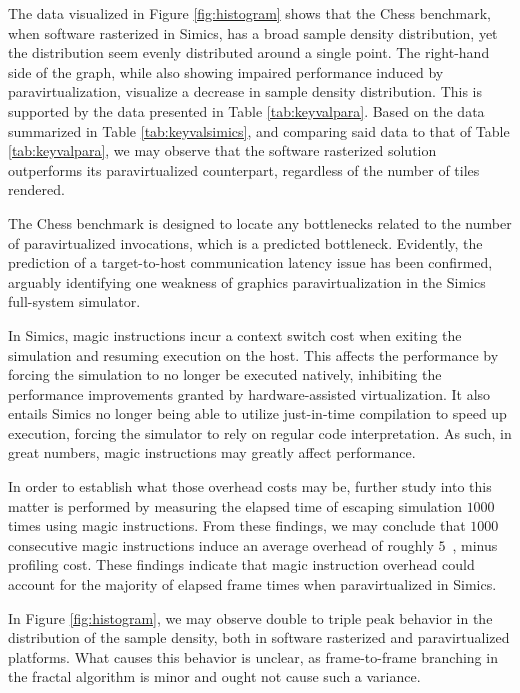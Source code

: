 The data visualized in Figure \ref{fig:histogram} shows that the Chess benchmark, when software rasterized in Simics, has a broad sample density distribution, yet the distribution seem evenly distributed around a single point.
The right-hand side of the graph, while also showing impaired performance induced by paravirtualization, visualize a decrease in sample density distribution.
This is supported by the data presented in Table \ref{tab:keyvalpara}.
Based on the data summarized in Table \ref{tab:keyvalsimics}, and comparing said data to that of Table \ref{tab:keyvalpara}, we may observe that the software rasterized solution outperforms its paravirtualized counterpart, regardless of the number of tiles rendered.

The Chess benchmark is designed to locate any bottlenecks related to the number of paravirtualized invocations, which is a predicted bottleneck.
Evidently, the prediction of a target-to-host communication latency issue has been confirmed, arguably identifying one weakness of graphics paravirtualization in the Simics full-system simulator.

In Simics, magic instructions incur a context switch cost when exiting the simulation and resuming execution on the host.
This affects the performance by forcing the simulation to no longer be executed natively, inhibiting the performance improvements granted by hardware-assisted virtualization.
It also entails Simics no longer being able to utilize just-in-time compilation to speed up execution, forcing the simulator to rely on regular code interpretation.
As such, in great numbers, magic instructions may greatly affect performance.

In order to establish what those overhead costs may be, further study into this matter is performed by measuring the elapsed time of escaping simulation $1000$ times using magic instructions.
From these findings, we may conclude that $1000$ consecutive magic instructions induce an average overhead of roughly $5$~\milli\second , minus profiling cost.
These findings indicate that magic instruction overhead could account for the majority of elapsed frame times when paravirtualized in Simics.

In Figure \ref{fig:histogram}, we may observe double to triple peak behavior in the distribution of the sample density, both in software rasterized and paravirtualized platforms.
What causes this behavior is unclear, as frame-to-frame branching in the fractal algorithm is minor and ought not cause such a variance.

